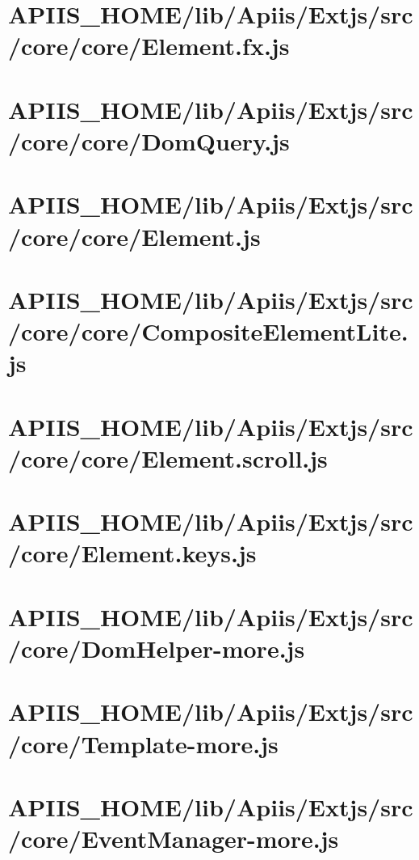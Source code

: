 \section{APIIS\_HOME/lib/Apiis/Extjs/src/core/core/Element.fx.js} 
\section{APIIS\_HOME/lib/Apiis/Extjs/src/core/core/DomQuery.js} 
\section{APIIS\_HOME/lib/Apiis/Extjs/src/core/core/Element.js} 
\section{APIIS\_HOME/lib/Apiis/Extjs/src/core/core/CompositeElementLite.js} 
\section{APIIS\_HOME/lib/Apiis/Extjs/src/core/core/Element.scroll.js} 
\section{APIIS\_HOME/lib/Apiis/Extjs/src/core/Element.keys.js} 
\section{APIIS\_HOME/lib/Apiis/Extjs/src/core/DomHelper-more.js} 
\section{APIIS\_HOME/lib/Apiis/Extjs/src/core/Template-more.js} 
\section{APIIS\_HOME/lib/Apiis/Extjs/src/core/EventManager-more.js} 
